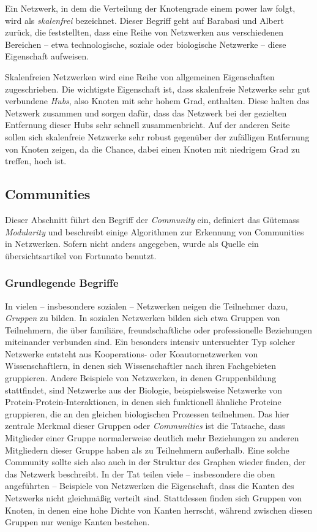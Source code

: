 Ein Netzwerk, in dem die Verteilung der Knotengrade einem power law
folgt, wird als \emph{skalenfrei} bezeichnet. Dieser Begriff geht auf
Barabasi und Albert zur\"uck, die feststellten, dass eine Reihe von
Netzwerken aus verschiedenen Bereichen -- etwa technologische, soziale
oder biologische Netzwerke -- diese Eigenschaft
aufweisen\cite{Barabasi1999}.

Skalenfreien Netzwerken wird eine Reihe von allgemeinen Eigenschaften
zugeschrieben. Die wichtigste Eigenschaft ist, dass skalenfreie
Netzwerke sehr gut verbundene \emph{Hubs}, also Knoten mit sehr hohem
Grad, enthalten. Diese halten das Netzwerk zusammen und sorgen
daf\"ur, dass das Netzwerk bei der gezielten Entfernung dieser Hubs
sehr schnell zusammenbricht. Auf der anderen Seite sollen sich
skalenfreie Netzwerke sehr robust gegen\"uber der zuf\"alligen
Entfernung von Knoten zeigen, da die Chance, dabei einen Knoten mit
niedrigem Grad zu treffen, hoch ist\cite{Albert2000}.

\subsection{Communities}
\label{ch:Grundlagen:sec:Netzwerkanalyse:subsec:Communities}

Dieser Abschnitt führt den Begriff der \emph{Community} ein,
definiert das Gütemass \emph{Modularity} und beschreibt einige
Algorithmen zur Erkennung von Communities in Netzwerken. Sofern nicht
anders angegeben, wurde als Quelle ein übersichtsartikel von
Fortunato \cite{Fortunato2010} benutzt.

\subsubsection{Grundlegende Begriffe}
\label{sec:grundl-begr}

In vielen -- insbesondere sozialen -- Netzwerken neigen die Teilnehmer
dazu, \emph{Gruppen} zu bilden. In sozialen Netzwerken bilden sich
etwa Gruppen von Teilnehmern, die über familiäre,
freundschaftliche oder professionelle Beziehungen miteinander
verbunden sind. Ein besonders intensiv untersuchter Typ solcher
Netzwerke entsteht aus Kooperations- oder Koautornetzwerken von
Wissenschaftlern, in denen sich Wissenschaftler nach ihren
Fachgebieten gruppieren. Andere Beispiele von Netzwerken, in denen
Gruppenbildung stattfindet, sind Netzwerke aus der Biologie,
beispielsweise Netzwerke von Protein-Protein-Interaktionen, in denen
sich funktionell ähnliche Proteine gruppieren, die an den gleichen
biologischen Prozessen teilnehmen. Das hier zentrale Merkmal dieser
Gruppen oder \emph{Communities} ist die Tatsache, dass Mitglieder
einer Gruppe normalerweise deutlich mehr Beziehungen zu anderen
Mitgliedern dieser Gruppe haben als zu Teilnehmern außerhalb. Eine
solche Community sollte sich also auch in der Struktur des Graphen
wieder finden, der das Netzwerk beschreibt. In der Tat teilen viele --
insbesondere die oben angeführten -- Beispiele von Netzwerken die
Eigenschaft, dass die Kanten des Netzwerks nicht gleichmäßig
verteilt sind. Stattdessen finden sich Gruppen von Knoten, in denen
eine hohe Dichte von Kanten herrscht, während zwischen diesen
Gruppen nur wenige Kanten bestehen.

